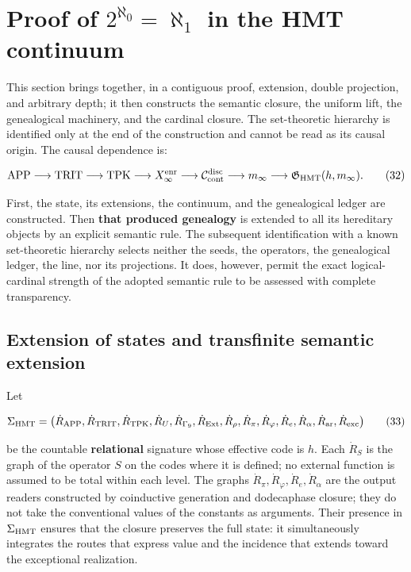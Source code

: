 \section{Proof of \texorpdfstring{\(2^{\aleph_0}=\aleph_1\)}{2 to the power aleph zero equals aleph one} in the HMT continuum}
\label{sec:cierre-cardinal-nativo}

This section brings together, in a contiguous proof, extension, double
projection, and arbitrary depth; it then constructs the semantic closure,
the uniform lift, the genealogical machinery, and the cardinal closure. The
set-theoretic hierarchy is identified only at the end of the construction and
cannot be read as its causal origin. The causal dependence is:

\[
 \mathrm{APP}\longrightarrow\mathrm{TRIT}\longrightarrow\mathrm{TPK}
 \longrightarrow X_\infty^{\rm enr}
 \longrightarrow\mathcal C_{\rm cont}^{\rm disc}
 \longrightarrow m_\infty
 \longrightarrow\mathfrak G_{\rm HMT}(h,m_\infty).
\tag{32}\label{eq:ch-cadena-causal}
\]

First, the state, its extensions, the continuum, and the genealogical ledger
are constructed. Then \textbf{that produced genealogy} is extended to all its
hereditary objects by an explicit semantic rule. The subsequent identification
with a known set-theoretic hierarchy selects neither the seeds, the operators,
the genealogical ledger, the line, nor its projections. It does, however,
permit the exact logical-cardinal strength of the adopted semantic rule to be
assessed with complete transparency.

\subsection{Extension of states and transfinite semantic extension}

Let

\[
 \Sigma_{\rm HMT}
 =\bigl(\dot R_{\rm APP},\dot R_{\rm TRIT},\dot R_{\rm TPK},
 \dot R_{U},\dot R_{\Gamma_9},\dot R_{\rm Ext},\dot R_\rho,
 \dot R_{\pi},\dot R_{\varphi},\dot R_e,\dot R_{\alpha},
 \dot R_{\rm ar},\dot R_{\rm exc}\bigr)
\tag{33}\label{eq:ch-signatura}
\]

be the countable \textbf{relational} signature whose effective code is \(h\).
Each \(\dot R_S\) is the graph of the operator \(S\) on the codes where it is
defined; no external function is assumed to be total within each level. The
graphs \(\dot R_{\pi},\dot R_{\varphi},\dot R_e,\dot R_{\alpha}\) are the
output readers constructed by coinductive generation and dodecaphase closure;
they do not take the conventional values of the constants as arguments. Their
presence in \(\Sigma_{\rm HMT}\) ensures that the closure preserves the full
state: it simultaneously integrates the routes that express value and the
incidence that extends toward the exceptional realization.

